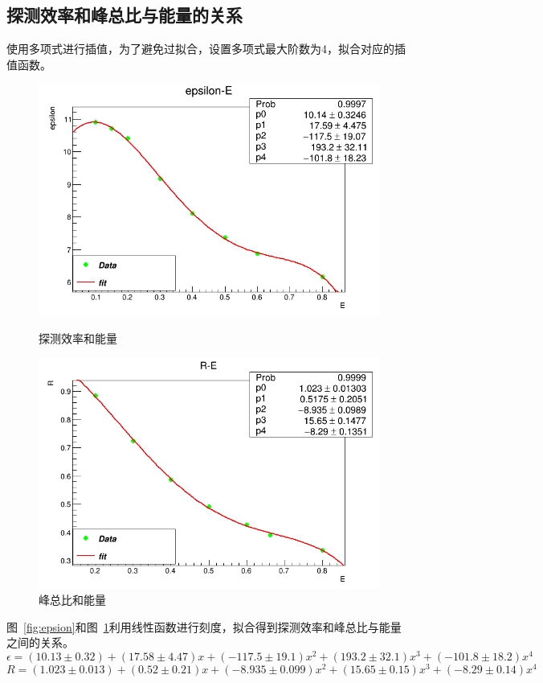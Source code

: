 \documentclass[10pt]{ctexart}
\begin{document}
\subsection{探测效率和峰总比与能量的关系}
使用多项式进行插值，为了避免过拟合，设置多项式最大阶数为4，拟合对应的插值函数。
\begin{figure}[htbp]
    \centering
    \begin{minipage}{0.45\textwidth}
        \centering
        \includegraphics[width=\textwidth]{data/epsilon.png}
        \caption{探测效率和能量}
        \label{fig:epsilon}
    \end{minipage}
    \qquad
    \begin{minipage}{0.45\textwidth}
        \centering
        \includegraphics[width=\textwidth]{data/R.png}
        \caption{峰总比和能量}
        \label{fig:R}
    \end{minipage}
\end{figure}
图~\ref{fig:epsion}和图~\ref{fig:R}利用线性函数进行刻度，拟合得到探测效率和峰总比与能量之间的关系。
\[\epsilon=(10.13\pm0.32)+(17.58\pm 4.47)x+(-117.5\pm19.1)x^2+(193.2\pm32.1)x^3+(-101.8\pm18.2)x^4\]
\[R=(1.023\pm0.013)+(0.52\pm 0.21)x+(-8.935\pm0.099)x^2+(15.65\pm0.15)x^3+(-8.29\pm0.14)x^4\]
\end{document}
